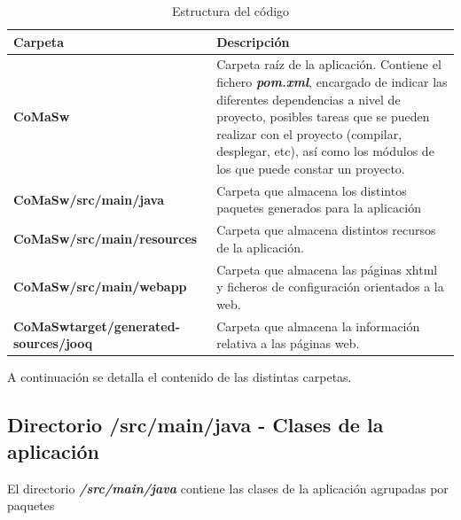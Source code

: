 \begin{table} [H]
    \centering
    \setlength{\leftmargini}{0.4cm}
	\resizebox{14cm}{!} { %
    \begin{tabular}{| m{4.5cm} | m{9.5cm} |}   
    \hline
	  \textbf{Carpeta} & \textbf{Descripción} 
	  \\\hline
	  \textbf{CoMaSw} & Carpeta raíz de la aplicación. Contiene el fichero \textit{\textbf{pom.xml}}, encargado de indicar las diferentes dependencias a nivel de proyecto, posibles tareas que se pueden realizar con el proyecto (compilar, desplegar, etc), así como los módulos de los que puede constar un proyecto.
	  \\\hline
	  \textbf{CoMaSw/src/main/java} & Carpeta que almacena los distintos paquetes generados para la aplicación
	  \\\hline
	  \textbf{CoMaSw/src/main/resources} & Carpeta que almacena distintos recursos de la aplicación.
	  \\\hline
	  \textbf{CoMaSw/src/main/webapp} & Carpeta que almacena las páginas \acrshort{xhtml} y ficheros de configuración orientados a la web.
	  \\\hline
	  \textbf{CoMaSwtarget/generated-sources/jooq} & Carpeta que almacena la información relativa a las páginas web.
	  \\\hline
    \end{tabular}
    } %
    \caption{Estructura del código}
    \label{tab:estructura-codigo}
\end{table}


A continuación se detalla el contenido de las distintas carpetas.

\subsection{Directorio /src/main/java - Clases de la aplicación}
\label{sub:clases}
El directorio \textit{\textbf{/src/main/java}} contiene las clases de la aplicación agrupadas por paquetes



